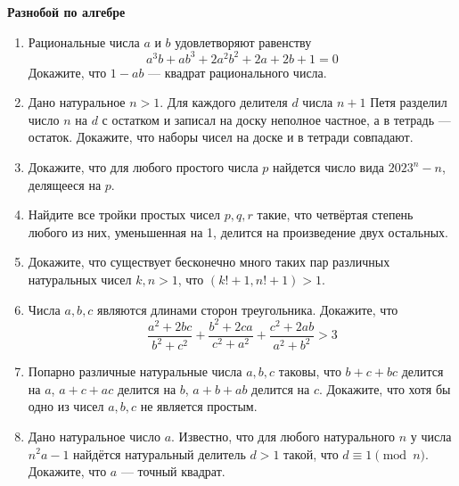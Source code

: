 \documentclass{article}
\begin{document}
\large
	

\begin{center}
\textbf{Разнобой по алгебре}
\end{center}

\begin{enumerate}[label*=\protect\fbox{\arabic{enumi}}]
	
	\item  Рациональные числа $a$ и $b$ удовлетворяют равенству 
	$$a^3b + ab^3 + 2a^2b^2+2a+2b+1 = 0$$
	Докажите, что $1 - ab$ — квадрат рационального числа.
	
	\item Дано натуральное $n > 1$. Для каждого делителя $d$ числа $n + 1$ Петя разделил
	число $n$ на $d$ с остатком и записал на доску неполное частное, а в тетрадь —
	остаток. Докажите, что наборы чисел на доске и в тетради совпадают.
	
	\item Докажите, что для любого простого числа $p$ найдется число вида $2023^n - n$,
	делящееся на $p$.
	
	\item Найдите все тройки простых чисел $p, q, r$ такие, что четвёртая степень любого из них, уменьшенная на 1, делится на произведение двух остальных.
	
	\item Докажите, что существует бесконечно много таких пар различных натуральных чисел $k, n > 1$, что $(k! + 1, n! + 1) > 1.$
	
	\item Числа $a, b, c$ являются длинами сторон треугольника. Докажите, что
	$$\frac{a^2 + 2bc}{b^2 + c^2} + \frac{b^2 + 2ca}{c^2 + a^2} +\frac{c^2 + 2ab}{a^2 + b^2} > 3$$
	
	\item Попарно различные натуральные числа $a, b, c$ таковы, что $b + c + bc$ делится
	на $a$, $a + c + ac$ делится на $b$, $a + b + ab$ делится на $c$. Докажите, что хотя бы
	одно из чисел $a, b, c$ не является простым.

	\item Дано натуральное число $a$. Известно, что для любого натурального $n$ у числа $n^2 a - 1$ найдётся натуральный делитель $d > 1$ такой, что $d \equiv 1 \pmod n$. Докажите, что $a$ — точный квадрат.

\end{enumerate}
\end{document}
